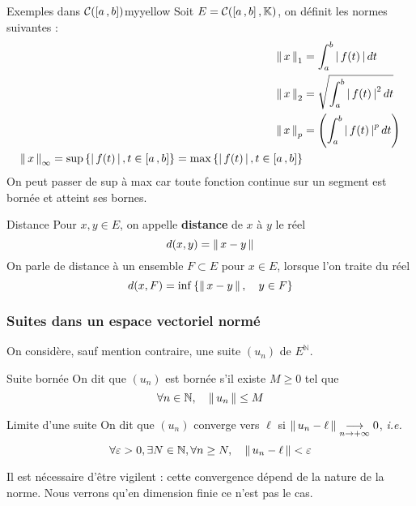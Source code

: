     \begin{omed}{Exemples dans $\mathcal{C}(\intervalleFF{a}{b})$}{myyellow}
        Soit $E = \mathcal{C}(\intervalleFF{a}{b}, \mathbb{K})$, on définit les normes suivantes :
        \begin{align*}
            \nnorm{1}{x} &= \int_{a}^{b} \abs{f(t)}dt \\
            \nnorm{2}{x} &= \sqrt{\int_{a}^{b} \abs{f(t)}^2 dt} \\
            \nnorm{p}{x} &= \left(\int_{a}^{b} \abs{f(t)}^p dt\right) \\
            \nnorm{\infty}{x} = \sup\left\{\abs{f(t)}, t \in \intervalleFF{a}{b}\right\} = \max\left\{\abs{f(t)}, t \in \intervalleFF{a}{b}\right\}
        \end{align*}
        On peut passer de sup à max car toute fonction continue sur un segment est bornée et atteint ses bornes.
    \end{omed}

    \begin{defi}{Distance}{}
        Pour $x,y \in E$, on appelle \textbf{distance} de $x$ à $y$ le réel 
        \[ d(x,y) = \norm{x-y} \]   
        On parle de distance à un ensemble $F \subset E$ pour $x \in E$, lorsque l’on traite du réel 
        \[ d(x,F) = \inf\left\{\norm{x-y}, \quad y \in F\right\} \]   
    \end{defi}

    \subsubsection{Suites dans un espace vectoriel normé}

    On considère, sauf mention contraire, une suite $(u_n)$ de $E^{\mathbb{N}}$.

    \begin{defi}{Suite bornée}{}
        On dit que $(u_n)$ est bornée s’il existe $M \geq 0$ tel que 
        \[ \forall n \in \mathbb{N}, \quad \norm{u_n} \leq M \]   
    \end{defi}

    \begin{defi}{Limite d’une suite}{}
        On dit que $(u_n)$ converge vers $\ell$ si $\norm{u_n - \ell} \limi{n}{+\infty} 0$, \textit{i.e.}
        \[ \forall \varepsilon > 0, \exists N \in \mathbb{N}, \forall n \geq N, \quad \norm{u_n - \ell} < \varepsilon \]  
    \end{defi}

    Il est nécessaire d’être vigilent : cette convergence dépend de la nature de la norme. Nous verrons qu’en dimension finie ce n’est pas le cas.

